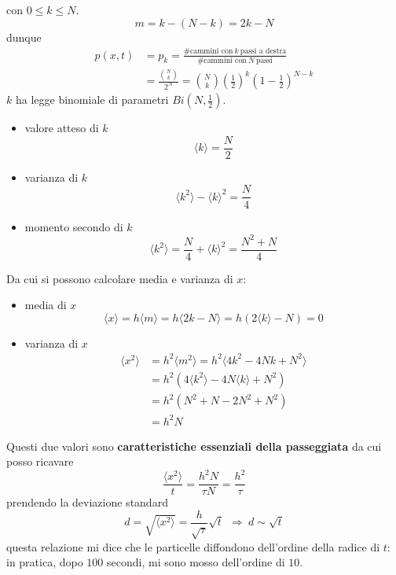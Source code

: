 \documentclass[10pt,a4paper,twoside,openright]{book}
\begin{document}
con $\displaystyle 0\leqslant k\leqslant N$.
\begin{equation*}
m=k-(N-k) =2k-N
\end{equation*}
dunque
\begin{align*}
p(x,t) & =p_{k} =\frac{\text{\#cammini con} \ k\ \text{passi a destra}}{\text{\#cammini con} \ N\ \text{passi}}\\
 & =\frac{\binom{N}{k}}{2^{N}} =\binom{N}{k}\left(\frac{1}{2}\right)^{k}\left( 1-\frac{1}{2}\right)^{N-k}
\end{align*}
$\displaystyle k$ ha legge binomiale di parametri $\displaystyle Bi\left( N,\frac{1}{2}\right)$.
\begin{itemize}
\item valore atteso di $\displaystyle k$\begin{equation*}
\langle k\rangle =\frac{N}{2}
\end{equation*}
\item varianza di $\displaystyle k$\begin{equation*}
\langle k^{2} \rangle -\langle k\rangle ^{2} =\frac{N}{4}
\end{equation*}
\item momento secondo di $\displaystyle k$\begin{equation*}
\langle k^{2} \rangle =\frac{N}{4} +\langle k\rangle ^{2} =\frac{N^{2} +N}{4}
\end{equation*}
\end{itemize}

Da cui si possono calcolare media e varianza di $\displaystyle x$:
\begin{itemize}
\item media di $\displaystyle x$\begin{equation*}
\langle x\rangle =h\langle m\rangle =h\langle 2k-N\rangle =h( 2\langle k\rangle -N) =0
\end{equation*}
\item varianza di $\displaystyle x$\begin{align*}
\langle x^{2} \rangle  & =h^{2} \langle m^{2} \rangle =h^{2} \langle 4k^{2} -4Nk+N^{2} \rangle \\
 & =h^{2}\left( 4\langle k^{2} \rangle -4N\langle k\rangle +N^{2}\right)\\
 & =h^{2}\left( N^{2} +N-2N^{2} +N^{2}\right)\\
 & =h^{2} N
\end{align*}
\end{itemize}

Questi due valori sono \textbf{caratteristiche essenziali della passeggiata} da cui posso ricavare 
\begin{equation*}
\frac{\langle x^{2} \rangle }{t} =\frac{h^{2} N}{\tau N} =\frac{h^{2}}{\tau }
\end{equation*}
prendendo la deviazione standard 
\begin{equation*}
d=\sqrt{\langle x^{2} \rangle } =\frac{h}{\sqrt{\tau }}\sqrt{t} \ \ \Rightarrow \ d\sim \sqrt{t}
\end{equation*}
questa relazione mi dice che le particelle diffondono dell'ordine della radice di $\displaystyle t$: in pratica, dopo $\displaystyle 100$ secondi, mi sono mosso dell'ordine di $\displaystyle 10$.
\end{document}
